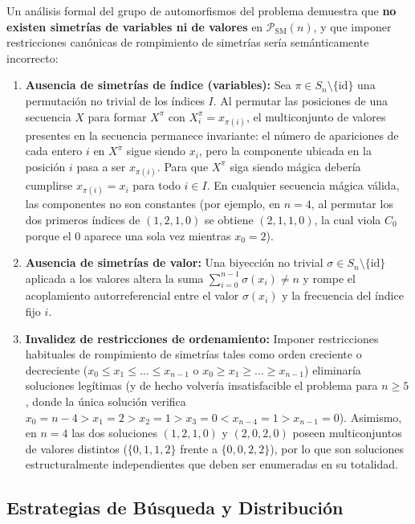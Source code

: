 Un análisis formal del grupo de automorfismos del problema demuestra que \textbf{no existen simetrías de variables ni de valores} en $\mathcal{P}_{\text{SM}}(n)$, y que imponer restricciones canónicas de rompimiento de simetrías sería semánticamente incorrecto:
\begin{enumerate}
    \item \textbf{Ausencia de simetrías de índice (variables):} Sea $\pi \in S_n \setminus \{\text{id}\}$ una permutación no trivial de los índices $I$. Al permutar las posiciones de una secuencia $X$ para formar $X^\pi$ con $X^\pi_i = x_{\pi(i)}$, el multiconjunto de valores presentes en la secuencia permanece invariante: el número de apariciones de cada entero $i$ en $X^\pi$ sigue siendo $x_i$, pero la componente ubicada en la posición $i$ pasa a ser $x_{\pi(i)}$. Para que $X^\pi$ siga siendo mágica debería cumplirse $x_{\pi(i)} = x_i$ para todo $i \in I$. En cualquier secuencia mágica válida, las componentes no son constantes (por ejemplo, en $n=4$, al permutar los dos primeros índices de $(1, 2, 1, 0)$ se obtiene $(2, 1, 1, 0)$, la cual viola $C_0$ porque el $0$ aparece una sola vez mientras $x_0 = 2$).
    \item \textbf{Ausencia de simetrías de valor:} Una biyección no trivial $\sigma \in S_n \setminus \{\text{id}\}$ aplicada a los valores altera la suma $\sum_{i=0}^{n-1} \sigma(x_i) \neq n$ y rompe el acoplamiento autorreferencial entre el valor $\sigma(x_i)$ y la frecuencia del índice fijo $i$.
    \item \textbf{Invalidez de restricciones de ordenamiento:} Imponer restricciones habituales de rompimiento de simetrías tales como orden creciente o decreciente ($x_0 \le x_1 \le \dots \le x_{n-1}$ o $x_0 \ge x_1 \ge \dots \ge x_{n-1}$) eliminaría soluciones legítimas (y de hecho volvería insatisfacible el problema para $n \ge 5$, donde la única solución verifica $x_0 = n-4 > x_1 = 2 > x_2 = 1 > x_3 = 0 < x_{n-4} = 1 > x_{n-1} = 0$). Asimismo, en $n=4$ las dos soluciones $(1, 2, 1, 0)$ y $(2, 0, 2, 0)$ poseen multiconjuntos de valores distintos ($\{0, 1, 1, 2\}$ frente a $\{0, 0, 2, 2\}$), por lo que son soluciones estructuralmente independientes que deben ser enumeradas en su totalidad.
\end{enumerate}

\subsection{Estrategias de Búsqueda y Distribución}

